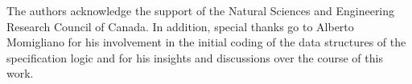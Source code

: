 The authors acknowledge the support of the Natural Sciences and
Engineering Research Council of Canada.  In addition, special thanks
go to Alberto Momigliano for his involvement in the initial coding of
the data structures of the specification logic and for his insights
and discussions over the course of this work.

